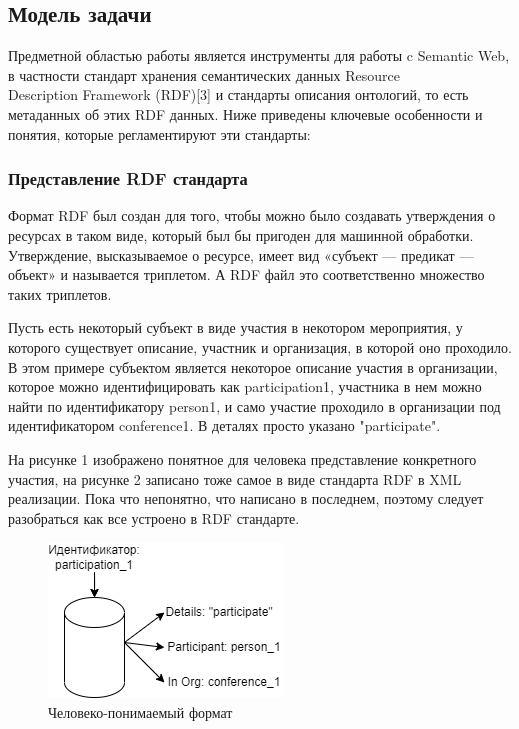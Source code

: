 \documentclass[12pt]{article}
\begin{document}
\subsection{Модель задачи}
Предметной областью работы является инструменты для работы c Semantic Web, в частности стандарт хранения семантических данных Resource \\ Description Framework (RDF)[3] и стандарты описания онтологий, то есть метаданных об этих RDF данных. Ниже приведены ключевые особенности и понятия, которые регламентируют эти стандарты:\par

\subsubsection{Представление RDF стандарта}

\qquad Формат RDF был создан для того, чтобы можно было создавать утверждения о ресурсах в таком виде, который был бы пригоден для машинной обработки. Утверждение, высказываемое о ресурсе, имеет вид «субъект — предикат — объект» и называется триплетом. А RDF файл это соответственно множество таких триплетов.\par

Пусть есть некоторый субъект в виде участия в некотором мероприятия, у которого существует описание, участник и организация, в которой оно проходило. В этом примере субъектом является некоторое описание участия в организации, которое можно идентифицировать как participation1, участника в нем можно найти по идентификатору person1, и само участие проходило в организации под идентификатором conference1. В деталях просто указано "participate".

На рисунке 1 изображено понятное для человека представление конкретного участия, на рисунке 2 записано тоже самое в виде стандарта RDF в XML реализации. Пока что непонятно, что написано в последнем, поэтому следует разобраться как все устроено в RDF стандарте.\par

\begin{figure}[!b]
    \centering
    \includegraphics{_images/eric.png}
    \caption{Человеко-понимаемый формат}
    \label{fig:eric}
\end{figure}
\end{document}
